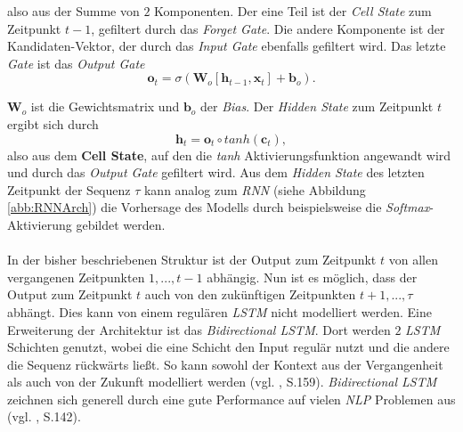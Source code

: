 \documentclass[a4paper,11pt]{article}
\begin{document}
also aus der Summe von $2$ Komponenten. Der eine Teil ist der \textit{Cell State} zum Zeitpunkt $t-1$, gefiltert durch das \textit{Forget Gate}. Die andere Komponente ist der Kandidaten-Vektor, der durch das \textit{Input Gate} ebenfalls gefiltert wird.
Das letzte \textit{Gate} ist das \textit{Output Gate} 
\[  \bm{o}_t = \sigma(\bm{W}_o [\bm{h}_{t-1}, \bm{x}_t] + \bm{b}_o).\]

$\bm{W}_o$ ist die Gewichtsmatrix und $\bm{b}_o$ der \textit{Bias}. Der \textit{Hidden State} zum Zeitpunkt $t$ ergibt sich durch
\[\bm{h}_t = \bm{o}_t \circ tanh(\bm{c}_t) , \]
also aus dem \textbf{Cell State}, auf den die \textit{tanh} Aktivierungsfunktion angewandt wird und durch das \textit{Output Gate} gefiltert wird. Aus dem \textit{Hidden State} des letzten Zeitpunkt der Sequenz $\tau$ kann analog zum \textit{RNN} (siehe Abbildung \ref{abb:RNNArch}) die Vorhersage des Modells durch beispielsweise die \textit{Softmax}-Aktivierung gebildet werden. \\
\\
In der bisher beschriebenen Struktur ist der Output zum Zeitpunkt $t$ von allen vergangenen Zeitpunkten $1,...,t-1$ abhängig. Nun ist es möglich, dass der Output zum Zeitpunkt $t$ auch von den zukünftigen Zeitpunkten $t+1,..., \tau$ abhängt. Dies kann von einem regulären \textit{LSTM} nicht modelliert werden. Eine Erweiterung der Architektur ist das \textit{Bidirectional LSTM}. Dort werden $2$ \textit{LSTM} Schichten genutzt, wobei die eine Schicht den Input regulär nutzt und die andere die Sequenz rückwärts ließt. So kann sowohl der Kontext aus der Vergangenheit als auch von der Zukunft modelliert werden (vgl. \cite{deepEssentials}, S.159).
\textit{Bidirectional LSTM} zeichnen sich generell durch eine gute Performance auf vielen \textit{NLP} Problemen aus (vgl. \cite{deepNLP}, S.142).


\newpage
\end{document}
